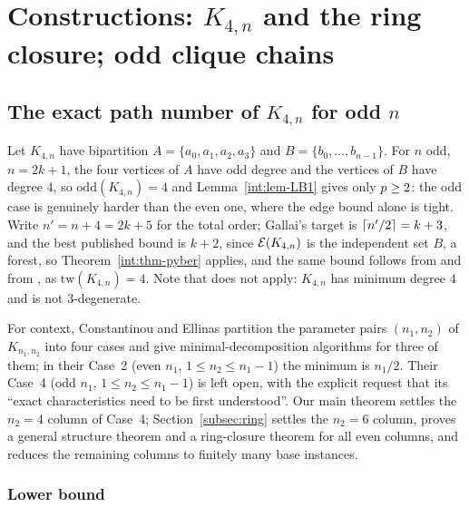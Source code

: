 \section{Constructions: \texorpdfstring{$K_{4,n}$}{K(4,n)} and the ring
closure; odd clique chains}\label{sec:constructions}

\subsection{The exact path number of \texorpdfstring{$K_{4,n}$}{K(4,n)} for
odd \texorpdfstring{$n$}{n}}\label{subsec:k4odd}

Let $K_{4,n}$ have bipartition $A=\{a_0,a_1,a_2,a_3\}$ and
$B=\{b_0,\dots,b_{n-1}\}$. For $n$ odd, $n=2k+1$, the four vertices of $A$
have odd degree and the vertices of $B$ have degree $4$, so
$\mathrm{odd}(K_{4,n})=4$ and Lemma~\ref{int:lem-LB1} gives only $p\ge2$: the
odd case is genuinely harder than the even one, where the edge bound alone
is tight. Write $n'=n+4=2k+5$ for the total order; Gallai's target is
$\left\lceil n'/2 \right\rceil=k+3$, and the best published bound is $k+2$, since
$\mathcal{E}(K_{4,n})$ is the independent set $B$, a forest, so
Theorem~\ref{int:thm-pyber} applies, and the same bound follows from
\cite{Fan05} and from \cite{LY24}, as $\mathrm{tw}(K_{4,n})=4$. Note that
\cite{ZLH24} does not apply: $K_{4,n}$ has minimum degree $4$ and is not
$3$-degenerate.

For context, Constantinou and Ellinas \cite{CE18} partition the parameter
pairs $(n_1,n_2)$ of $K_{n_1,n_2}$ into four cases and give
minimal-decomposition algorithms for three of them; in their Case~2 (even
$n_1$, $1\le n_2\le n_1-1$) the minimum is $n_1/2$. Their Case~4 (odd
$n_1$, $1\le n_2\le n_1-1$) is left open, with the explicit request that
its ``exact characteristics need to be first understood''. Our main theorem
settles the $n_2=4$ column of Case~4;
Section~\ref{subsec:ring} settles the $n_2=6$ column, proves a general
structure theorem and a ring-closure theorem for all even columns, and
reduces the remaining columns to finitely many base instances.

\subsubsection{Lower bound}

